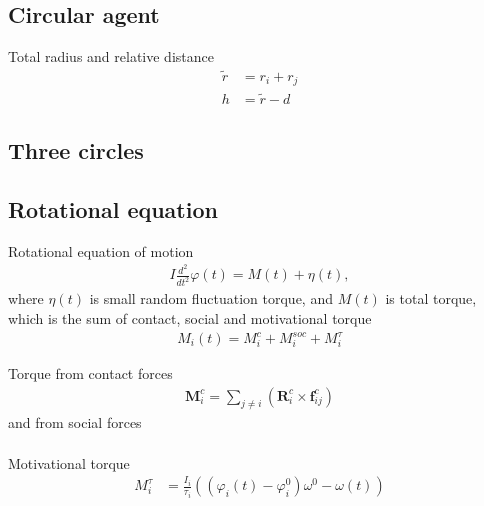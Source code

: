 \subsection{Circular agent}
Total radius and relative distance
\begin{align}
\tilde{r} &= r_{i} + r_{j} \\
h &= \tilde{r} - d
\end{align}

\subsection{Three circles}


\subsection{Rotational equation}
Rotational equation of motion 
\begin{align}
I \frac{d^{2}}{d t^{2}} \varphi(t) = M(t) + \eta(t),
\end{align}
where $ \eta(t) $ is small random fluctuation torque, and $ M(t) $ is total torque, which is the sum of contact, social and motivational torque
\begin{align}
M_{i}(t) = M_{i}^{c} + M_{i}^{soc} + M_{i}^{\tau}
\end{align}

Torque from contact forces
\begin{align}
\mathbf{M}_{i}^{c} = \sum_{j\neq i}^{} \left(\mathbf{R}_{i}^{c} \times \mathbf{f}_{ij}^{c}\right)
\end{align}
and from social forces
\begin{align}
\end{align}

Motivational torque
\begin{align}
M_{i}^{\tau} &= \frac{I_{i}}{\tau_{i}} \left((\varphi_{i}(t) - \varphi_{i}^{0}) \omega^{0} - \omega(t)\right) \\
\end{align}


